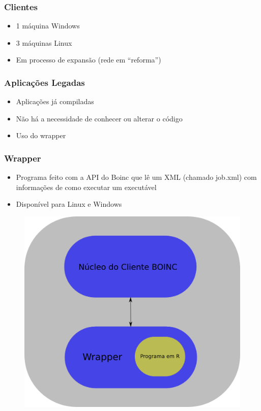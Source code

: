 \documentclass{beamer}
\begin{document}
\begin{frame}
  \frametitle{Clientes}
  \begin{itemize}
    \item 1 máquina Windows
    \item 3 máquinas Linux
    \item Em processo de expansão (rede em ``reforma'')
  \end{itemize}
\end{frame}

\begin{frame}
  \frametitle{Aplicações Legadas}
  \begin{itemize}
    \item Aplicações já compiladas
    \item Não há a necessidade de conhecer ou alterar o código
    \item Uso do wrapper
  \end{itemize}
\end{frame}

\begin{frame}[fragile]
  \frametitle{Wrapper}
  \begin{itemize}
    \item Programa feito com a API do Boinc que lê um XML (chamado job.xml)  com informações de como executar um executável
    \item Disponível para Linux e Windows
  \end{itemize}
  \begin{figure}
    \includegraphics[scale=0.15]{boinc-diagram-wrapper.png}
  \end{figure}
  
\end{frame}
\end{document}

